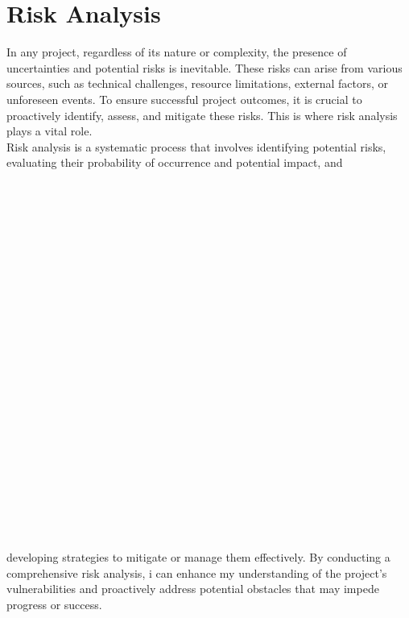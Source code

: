 \documentclass[eng]{class}
\begin{document}
\section{Risk Analysis}
In any project, regardless of its nature or complexity, the presence of uncertainties and potential risks is inevitable.
These risks can arise from various sources, such as technical challenges, resource limitations, external factors, or unforeseen events.
To ensure successful project outcomes, it is crucial to proactively identify, assess, and mitigate these risks. This is where risk analysis plays a vital role.\\
Risk analysis is a systematic process that involves identifying potential risks, evaluating their probability of occurrence and potential impact,
and
\\
\\
\\
\\
\\
\\
\\
\\
\\
\\
\\
\\
\\
\\
\\
\\
\\
\\
\\
\\
\\
\\
\\
\\
\\
developing strategies to mitigate or manage them effectively. By conducting a comprehensive risk analysis,
i can enhance my understanding of the project's vulnerabilities and proactively address potential obstacles that may impede progress or success.\\
\end{document}
